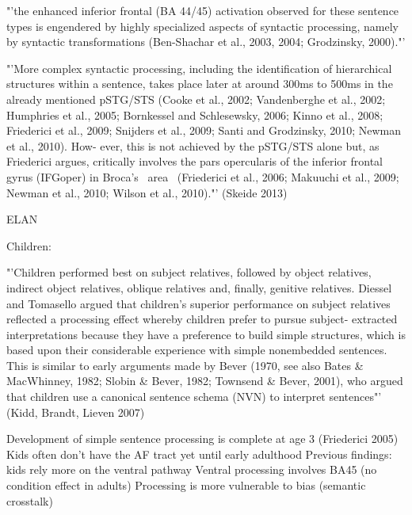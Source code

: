 "'the enhanced inferior frontal (BA 44/45) activation observed for these sentence types is engendered by highly specialized aspects of syntactic processing, namely by syntactic transformations (Ben-Shachar et al., 2003, 2004; Grodzinsky, 2000)."'

 "'More complex syntactic processing, 
 including the identification of hierarchical structures within a sentence, takes 
 place later at around 300ms to 500ms in the already mentioned pSTG/STS 
 (Cooke et al., 2002; Vandenberghe et al., 2002; Humphries et al., 2005; 
 Bornkessel and Schlesewsky, 2006; Kinno et al., 2008; Friederici et al., 2009; 
 Snijders et al., 2009; Santi and Grodzinsky, 2010; Newman et al., 2010). How-
 ever, this is not achieved by the pSTG/STS alone but, as Friederici argues, 
 critically involves the pars opercularis of the inferior frontal gyrus (IFGoper) in 
 Broca's  area  (Friederici et al., 2006; Makuuchi et al., 2009; Newman et al., 
 2010; Wilson et al., 2010)."' (Skeide 2013)

 ELAN

Children:

"'Children
 performed best on subject relatives, followed by object relatives, indirect
 object relatives, oblique relatives and, finally, genitive relatives. Diessel and
 Tomasello argued that children's superior performance on subject relatives
 reflected a processing effect whereby children prefer to pursue subject-
 extracted interpretations because they have a preference to build simple
 structures, which is based upon their considerable experience with simple
 nonembedded sentences. This is similar to early arguments made by Bever
 (1970, see also Bates \& MacWhinney, 1982; Slobin \& Bever, 1982; Townsend
 \& Bever, 2001), who argued that children use a canonical sentence schema
 (NVN) to interpret sentences"' (Kidd, Brandt, Lieven 2007)

Development of simple sentence processing is complete at age 3 (Friederici 2005)
Kids often don't have the AF tract yet until early adulthood
Previous findings: kids rely more on the ventral pathway
Ventral processing involves BA45 (no condition effect in adults)
Processing is more vulnerable to bias (semantic crosstalk)


